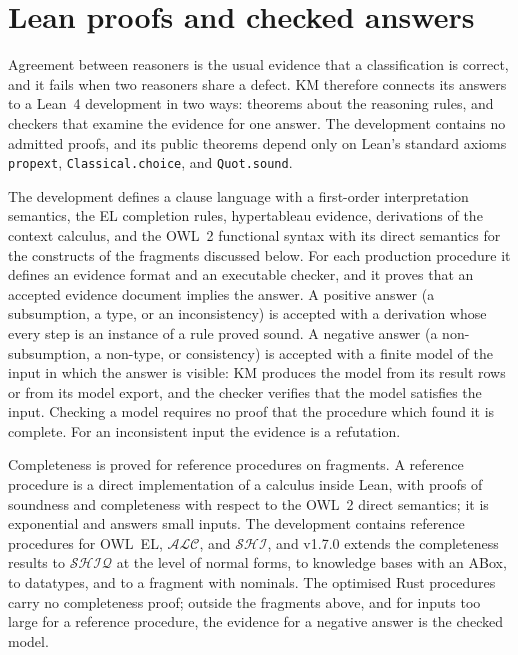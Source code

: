 \section{Lean proofs and checked answers}
\label{sec:certification}

Agreement between reasoners is the usual evidence that a classification is
correct, and it fails when two reasoners share a defect.  KM therefore
connects its answers to a Lean~4 development \cite{demoura2021lean4} in two
ways: theorems about the reasoning rules, and checkers that examine the
evidence for one answer.  The development contains no admitted proofs, and
its public theorems depend only on Lean's standard axioms
\texttt{propext}, \texttt{Classical.choice}, and \texttt{Quot.sound}.

The development defines a clause language with a first-order interpretation
semantics, the EL completion rules, hypertableau evidence, derivations of the
context calculus, and the OWL~2 functional syntax with its direct semantics
for the constructs of the fragments discussed below.  For each production
procedure it defines an evidence format and an executable checker, and it
proves that an accepted evidence document implies the answer.  A positive
answer (a subsumption, a type, or an inconsistency) is accepted with a
derivation whose every step is an instance of a rule proved sound.  A negative
answer (a non-subsumption, a non-type, or consistency) is accepted with a
finite model of the input in which the answer is visible: KM produces the
model from its result rows or from its model export, and the checker verifies
that the model satisfies the input.  Checking a model requires no proof that
the procedure which found it is complete.  For an inconsistent input the
evidence is a refutation.

Completeness is proved for reference procedures on fragments.  A reference
procedure is a direct implementation of a calculus inside Lean, with proofs of
soundness and completeness with respect to the OWL~2 direct semantics; it is
exponential and answers small inputs.  The development contains reference
procedures for OWL~EL, $\mathcal{ALC}$, and $\mathcal{SHI}$, and v1.7.0
extends the completeness results to $\mathcal{SHIQ}$ at the level of normal
forms, to knowledge bases with an ABox, to datatypes, and to a fragment with
nominals.  
The optimised Rust procedures carry no completeness proof; outside the
fragments above, and for inputs too large for a reference procedure, the
evidence for a negative answer is the checked model.

